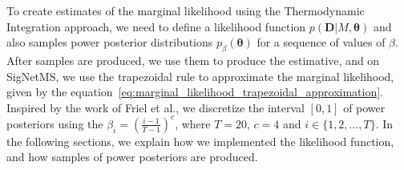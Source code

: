 
To create estimates of the marginal likelihood using the Thermodynamic
Integration approach, we need to define a likelihood function $p({\bm
D}| M, {\bm \theta})$ and also samples power posterior distributions
$p_\beta({\bm \theta})$ for a sequence of values of $\beta$. After
samples are produced, we use them to produce the estimative, and on
SigNetMS, we use the trapezoidal rule to approximate the marginal 
likelihood, given by the 
equation~\ref{eq:marginal_likelihood_trapezoidal_approximation}. 
Inspired by the work of Friel et al., we discretize the interval 
$[0, 1]$ of power posteriors using the $\beta_i = \left(\frac{i - 1}{T -
1}\right)^c$, where $T = 20$, $c = 4$ and $i \in \{1, 2, \ldots, T\}$.
In the following sections, we explain how we implemented the likelihood
function, and how samples of power posteriors are produced.


